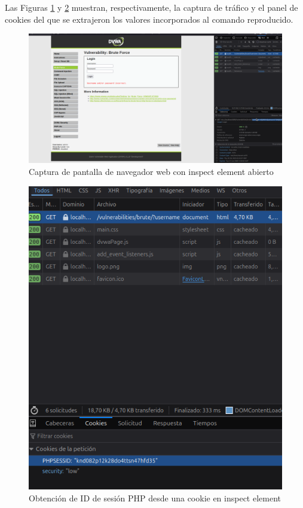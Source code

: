 \documentclass[letterpaper,12pt]{article}
\begin{document}
Las Figuras \ref{fig:inspectelement} y \ref{fig:inspectelementcookie} muestran, respectivamente, la captura de tráfico y el panel de cookies del que se extrajeron los valores incorporados al comando reproducido.
\begin{figure}
    \centering
    \includegraphics[width=1\linewidth]{curl/Captura desde 2025-10-01 23-42-53.png}
    \caption{Captura de pantalla de navegador web con inspect element abierto}
    \label{fig:inspectelement}
\end{figure}
\begin{figure}
    \centering
    \includegraphics[width=1\linewidth]{curl/Captura desde 2025-10-01 23-43-11.png}
    \caption{Obtención de ID de sesión PHP desde una cookie en inspect element}
    \label{fig:inspectelementcookie}
\end{figure}
\end{document}
